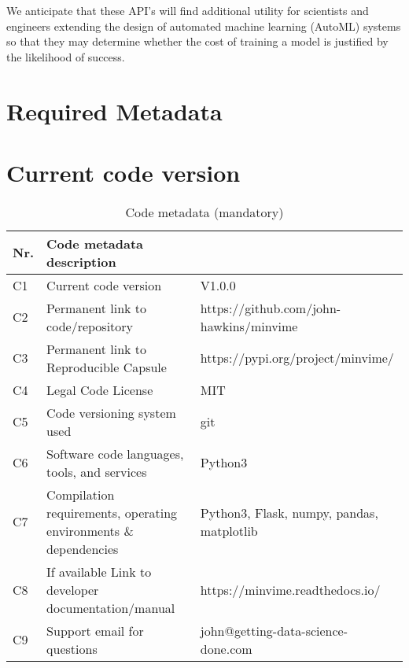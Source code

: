 \documentclass[preprint,12pt, a4paper]{elsarticle}
\begin{document}
We anticipate that these API's will find additional
utility for scientists and engineers extending the design of automated machine learning
(AutoML) \cite{zoller2021} systems so that they may determine whether the cost 
of training a model is justified by the likelihood of success.






\section*{Required Metadata}
\label{}

\section*{Current code version}
\label{}

\begin{table}[!h]
\begin{tabular}{|l|p{6.5cm}|p{6.5cm}|}
\hline
\textbf{Nr.} & \textbf{Code metadata description} & \textbf{} \\
\hline
C1 & Current code version & V1.0.0 \\
\hline
C2 & Permanent link to code/repository & https://github.com/john-hawkins/minvime \\
\hline
C3  & Permanent link to Reproducible Capsule & https://pypi.org/project/minvime/ \\
\hline
C4 & Legal Code License   & MIT \\
\hline
C5 & Code versioning system used & git \\
\hline
C6 & Software code languages, tools, and services & Python3\\
\hline
C7 & Compilation requirements, operating environments \& dependencies & Python3, Flask, numpy, pandas, matplotlib\\
\hline
C8 & If available Link to developer documentation/manual & https://minvime.readthedocs.io/ \\
\hline
C9 & Support email for questions & john@getting-data-science-done.com \\
\hline
\end{tabular}
\caption{Code metadata (mandatory)}
\label{} 
\end{table}
\end{document}
